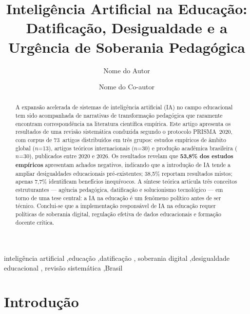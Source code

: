 \documentclass[preprint,12pt,authoryear]{elsarticle}
\begin{document}
\begin{frontmatter}

\title{Inteligência Artificial na Educação: Datificação,
       Desigualdade e a Urgência de Soberania Pedagógica}

\author[inst1]{Nome do Autor}
\author[inst2]{Nome do Co-autor}


\begin{abstract}
A expansão acelerada de sistemas de inteligência artificial (IA) no
campo educacional tem sido acompanhada de narrativas de transformação
pedagógica que raramente encontram correspondência na literatura
científica empírica.
Este artigo apresenta os resultados de uma revisão sistemática
conduzida segundo o protocolo PRISMA~2020, com corpus de 73~artigos
distribuídos em três grupos: estudos empíricos de âmbito global
($n$=13), artigos teóricos internacionais ($n$=30) e produção
acadêmica brasileira ($n$=30), publicados entre 2020 e 2026.
Os resultados revelam que \textbf{53,8\% dos estudos empíricos}
apresentam achados negativos, indicando que a introdução de IA tende
a ampliar desigualdades educacionais pré-existentes; 38,5\% reportam
resultados mistos; apenas 7,7\% identificam benefícios inequívocos.
A síntese teórica articula três conceitos estruturantes ---
agência pedagógica, datificação e solucionismo tecnológico ---
em torno de uma tese central: a IA na educação é um fenômeno político
antes de ser técnico.
Conclui-se que a implementação responsável de IA na educação requer
políticas de soberania digital, regulação efetiva de dados
educacionais e formação docente crítica.
\end{abstract}

\begin{keyword}
inteligência artificial \sep educação \sep datificação \sep
soberania digital \sep desigualdade educacional \sep
revisão sistemática \sep Brasil
\end{keyword}

\end{frontmatter}

\section{Introdução}
\end{document}
